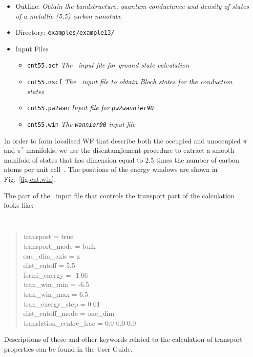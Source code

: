 \documentclass[a4paper,11pt,twoside]{article}
\begin{document}
\begin{itemize}
  \item{Outline: \it{Obtain the bandstructure, quantum conductance and
  density of states of a metallic (5,5) carbon nanotube}}
  \item{Directory: {\tt examples/example13/}}
  \item{Input Files}
    \begin{itemize}
      \item{ {\tt cnt55.scf}  {\it The \pwscf\ input file for ground state
	  calculation}}
      \item{ {\tt cnt55.nscf}  {\it The \pwscf\ input file to obtain Bloch
	  states for the conduction states}} 
      \item{ {\tt cnt55.pw2wan}  {\it Input file for {\tt pw2wannier90}}}
      \item{ {\tt cnt55.win}  {\it The {\tt wannier90} input file}}
    \end{itemize}
\end{itemize}

In order to form localised WF that describe both the occupied and
unoccupied $\pi$ and $\pi^{\ast}$ manifolds, we use the
disentanglement procedure to extract a smooth manifold of states that
has dimension equal to 2.5 times the number of carbon atoms per unit
cell~\cite{lee-prl05}. The positions of the energy windows are shown in
Fig.~\ref{fig:cnt.win}.

The part of the \wannier\ input file that controls the transport part
of the calculation looks like:

{\tt
\begin{quote}
transport                 = true\\
transport\_mode           = bulk\\
one\_dim\_axis            = z\\
dist\_cutoff              =  5.5\\
fermi\_energy             = -1.06\\
tran\_win\_min            = -6.5\\
tran\_win\_max            = 6.5\\
tran\_energy\_step         = 0.01\\
dist\_cutoff\_mode        = one\_dim\\
translation\_centre\_frac = 0.0 0.0 0.0
\end{quote} }

Descriptions of these and other keywords related to the calculation of
transport properties can be found in the User Guide.
\end{document}
